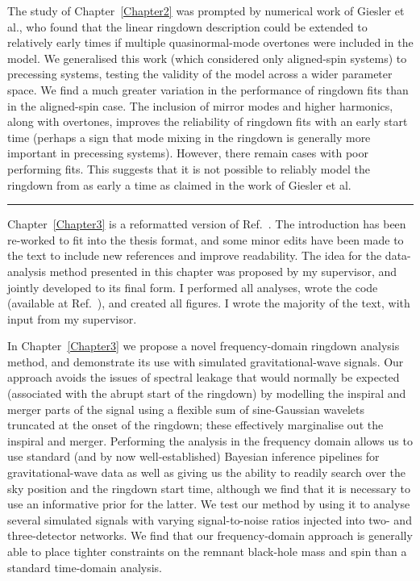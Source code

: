 \documentclass[
12pt, %
english, %
doublespacing, %
headsepline, %
]{MastersDoctoralThesis} %
\begin{document}
\vspace{0.2cm}

\noindent The study of Chapter~\ref{Chapter2} was prompted by numerical work of Giesler et al., who found that the linear ringdown description could be extended to relatively early times if multiple quasinormal-mode overtones were included in the model.
We generalised this work (which considered only aligned-spin systems) to precessing systems, testing the validity of the model across a wider parameter space.
We find a much greater variation in the performance of ringdown fits than in the aligned-spin case. 
The inclusion of mirror modes and higher harmonics, along with overtones, improves the reliability of ringdown fits with an early start time (perhaps a sign that mode mixing in the ringdown is generally more important in precessing systems).
However, there remain cases with poor performing fits.
This suggests that it is not possible to reliably model the ringdown from as early a time as claimed in the work of Giesler et al.

\begin{center}
    \rule[.5ex]{.5\textwidth}{.5pt}
\end{center}

\noindent Chapter~\ref{Chapter3} is a reformatted version of Ref.~\cite{Finch:2021qph}. 
The introduction has been re-worked to fit into the thesis format, and some minor edits have been made to the text to include new references and improve readability. 
The idea for the data-analysis method presented in this chapter was proposed by my supervisor, and jointly developed to its final form.
I performed all analyses, wrote the code (available at Ref.~\cite{fdringdown}), and created all figures. 
I wrote the majority of the text, with input from my supervisor.

\vspace{0.2cm}

\noindent In Chapter~\ref{Chapter3} we propose a novel frequency-domain ringdown analysis method, and demonstrate its use with simulated gravitational-wave signals.
Our approach avoids the issues of spectral leakage that would normally be expected (associated with the abrupt start of the ringdown) by modelling the inspiral and merger parts of the signal using a flexible sum of sine-Gaussian wavelets truncated at the onset of the ringdown; these effectively marginalise out the inspiral and merger.
Performing the analysis in the frequency domain allows us to use standard (and by now well-established) Bayesian inference pipelines for gravitational-wave data as well as giving us the ability to readily search over the sky position and the ringdown start time, although we find that it is necessary to use an informative prior for the latter. 
We test our method by using it to analyse several simulated signals with varying signal-to-noise ratios injected into two- and three-detector networks. 
We find that our frequency-domain approach is generally able to place tighter constraints on the remnant black-hole mass and spin than a standard time-domain analysis.
\end{document}
